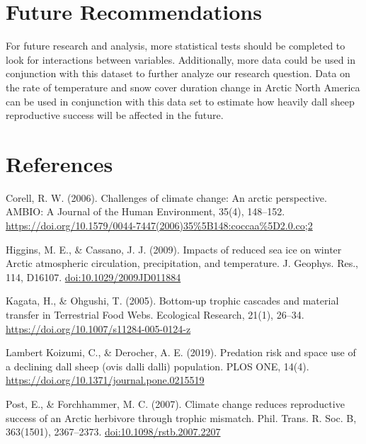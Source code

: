 \documentclass[
  12pt,
]{article}
\begin{document}
\hypertarget{future-recommendations}{%
\section{Future Recommendations}\label{future-recommendations}}

For future research and analysis, more statistical tests should be
completed to look for interactions between variables. Additionally, more
data could be used in conjunction with this dataset to further analyze
our research question. Data on the rate of temperature and snow cover
duration change in Arctic North America can be used in conjunction with
this data set to estimate how heavily dall sheep reproductive success
will be affected in the future.

\newpage

\hypertarget{references}{%
\section{References}\label{references}}

Corell, R. W. (2006). Challenges of climate change: An arctic
perspective. AMBIO: A Journal of the Human Environment, 35(4), 148--152.
\url{https://doi.org/10.1579/0044-7447(2006)35\%5B148:coccaa\%5D2.0.co;2}

Higgins, M. E., \& Cassano, J. J. (2009). Impacts of reduced sea ice on
winter Arctic atmospheric circulation, precipitation, and temperature.
J. Geophys. Res., 114, D16107. \url{doi:10.1029/2009JD011884}

Kagata, H., \& Ohgushi, T. (2005). Bottom-up trophic cascades and
material transfer in Terrestrial Food Webs. Ecological Research, 21(1),
26--34. \url{https://doi.org/10.1007/s11284-005-0124-z}

Lambert Koizumi, C., \& Derocher, A. E. (2019). Predation risk and space
use of a declining dall sheep (ovis dalli dalli) population. PLOS ONE,
14(4). \url{https://doi.org/10.1371/journal.pone.0215519}

Post, E., \& Forchhammer, M. C. (2007). Climate change reduces
reproductive success of an Arctic herbivore through trophic mismatch.
Phil. Trans. R. Soc. B, 363(1501), 2367--2373.
\url{doi:10.1098/rstb.2007.2207}
\end{document}
